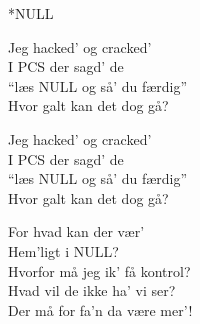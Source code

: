 \begin{song}{*NULL}
\begin{SBChorus}
  Jeg hacked' og cracked' \\
  I PCS der sagd' de \\
  ``læs NULL og så' du færdig'' \\
  Hvor galt kan det dog gå? \\
\end{SBChorus}

\medskip

\begin{SBChorus}
  Jeg hacked' og cracked' \\
  I PCS der sagd' de \\
  ``læs NULL og så' du færdig'' \\
  Hvor galt kan det dog gå? \\
\end{SBChorus}

\begin{SBSection*}
  For hvad kan der vær' \\
  Hem'ligt i NULL? \\
  Hvorfor må jeg ik' få kontrol? \\
  Hvad vil de ikke ha' vi ser? \\
  Der må for fa'n da være mer'! \\
\end{SBSection*}

\end{song}
